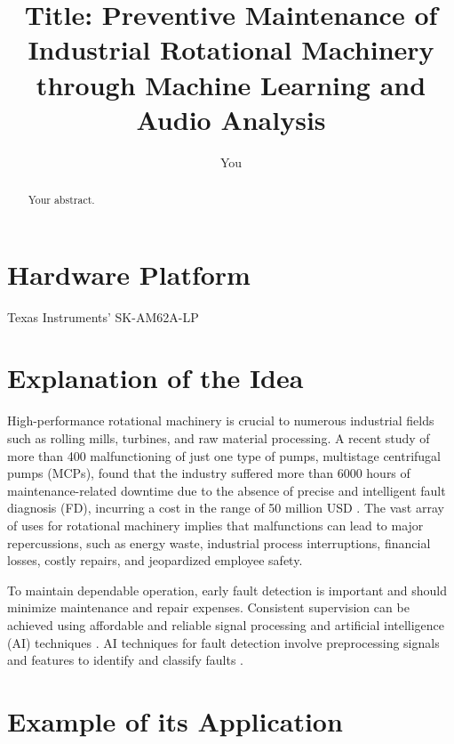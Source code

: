 \documentclass[12pt]{article}
\title{Title: Preventive Maintenance of Industrial Rotational Machinery through Machine Learning and Audio Analysis}
\author{You}
\begin{document}
\maketitle

\begin{abstract}
Your abstract.
\end{abstract}

\section{Hardware Platform}

Texas Instruments’ SK-AM62A-LP

\section{Explanation of the Idea}

High-performance rotational machinery is crucial to numerous industrial fields such as rolling mills, turbines, and raw material processing.
A recent study of more than 400 malfunctioning of just one type of pumps, multistage centrifugal pumps (MCPs), found that the industry suffered more than 6000 hours of maintenance-related downtime due to the absence of precise and intelligent fault diagnosis (FD), incurring a cost in the range of 50 million USD \cite{rane2021re}.
The vast array of uses for rotational machinery implies that malfunctions can lead to major repercussions, such as energy waste, industrial process interruptions, financial losses, costly repairs, and jeopardized employee safety. 

To maintain dependable operation, early fault detection is important and should minimize maintenance and repair expenses. Consistent supervision can be achieved using affordable and reliable signal processing and artificial intelligence (AI) techniques \cite{sunal2022review}. AI techniques for fault detection involve preprocessing signals and features to identify and classify faults \cite{saeed2021fault, jiang2019bearing}.


\section{Example of its Application}
\end{document}
